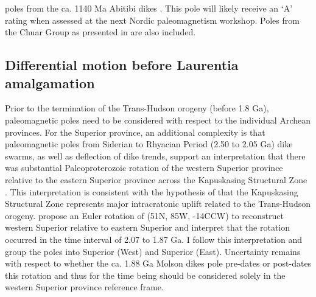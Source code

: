 \documentclass[11pt,letterpaper]{article}
\begin{document}
poles from the ca. 1140 Ma Abitibi dikes \citep{Ernst1993a}. This pole will likely receive an `A' rating when assessed at the next Nordic paleomagnetism workshop. Poles from the Chuar Group as presented in \cite{Eyster2019a} are also included. 

\subsection{Differential motion before Laurentia amalgamation}

Prior to the termination of the Trans-Hudson orogeny (before 1.8 Ga), paleomagnetic poles need to be considered with respect to the individual Archean provinces. For the Superior province, an additional complexity is that paleomagnetic poles from Siderian to Rhyacian Period (2.50 to 2.05 Ga) dike swarms, as well as deflection of dike trends, support an interpretation that there was substantial Paleoproterozoic rotation of the western Superior province relative to the eastern Superior province across the Kapuskasing Structural Zone \citep{Bates1991a, Evans2010a}. This interpretation is consistent with the hypothesis of \citet{Hoffman1988a} that the Kapuskasing Structural Zone represents major intracratonic uplift related to the Trans-Hudson orogeny. \cite{Evans2010a} propose an Euler rotation of (51\textdegree N, 85\textdegree W, -14\textdegree CCW) to reconstruct western Superior relative to eastern Superior and interpret that the rotation occurred in the time interval of 2.07 to 1.87 Ga.  I follow this interpretation and group the poles into Superior (West) and Superior (East).  Uncertainty remains with respect to whether the ca. 1.88 Ga Molson dikes pole pre-dates or post-dates this rotation and thus for the time being should be considered solely in the western Superior province reference frame. 
\end{document}
